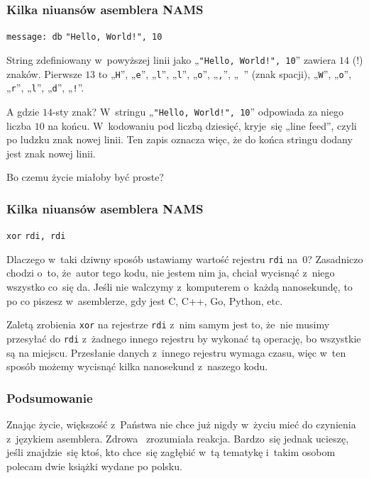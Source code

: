 \documentclass[10pt,t]{beamer}
\begin{document}
\begin{frame}
  \frametitle{Kilka niuansów asemblera NAMS}


  \texttt{message: db} \hphantom{aaaaa} \texttt{"Hello, World!", 10}

  String zdefiniowany w~powyższej linii jako „\texttt{"Hello, World!", 10}”
  zawiera $14$ (!) znaków. Pierwsze $13$ to „\texttt{H}”, „\texttt{e}”,
  „\texttt{l}”, „\texttt{l}”, „\texttt{o}”, „\texttt{,}”, „\texttt{ }”
  (znak spacji), „\texttt{W}”, „\texttt{o}”, „\texttt{r}”, „\texttt{l}”,
  „\texttt{d}”, „\texttt{!}”.

  A gdzie $14$-sty znak? W~stringu „\texttt{"Hello, World!", 10}”
  odpowiada za niego liczba $10$ na końcu. W~kodowaniu
   pod
  liczbą dziesięć, kryje~się „line feed”, czyli po ludzku znak nowej linii.
  Ten zapis oznacza więc, że do końca stringu dodany jest znak nowej linii.

  Bo czemu życie miałoby być proste?

\end{frame}





\begin{frame}
  \frametitle{Kilka niuansów asemblera NAMS}


  \hphantom{aaaaaaaaa} \texttt{xor} \hphantom{aaaaaa} \texttt{rdi, rdi}

  Dlaczego w~taki dziwny sposób ustawiamy wartość rejestru \texttt{rdi}
  na~$0$? Zasadniczo chodzi o~to, że~autor tego kodu, nie jestem nim ja,
  chciał wycisnąć z~niego wszystko co~się da. Jeśli nie walczymy
  z~komputerem o~każdą nanosekundę, to po co piszesz w~asemblerze, gdy jest
  C, C++, Go, Python, etc.

  Zaletą zrobienia \texttt{xor} na rejestrze \texttt{rdi} z~nim samym jest
  to, że~nie musimy przesyłać do \texttt{rdi} z~żadnego innego rejestru by
  wykonać tą operację, bo wszystkie są na miejscu. Przesłanie danych
  z~innego rejestru wymaga czasu, więc w~ten sposób możemy wycisnąć
  kilka nanosekund z~naszego kodu.

\end{frame}





\begin{frame}
  \frametitle{Podsumowanie}


  Znając życie, większość z~Państwa nie chce już nigdy w~życiu mieć
  do czynienia z~językiem asemblera. Zdrowa ~zrozumiała reakcja.
  Bardzo~się jednak ucieszę, jeśli znajdzie~się ktoś, kto chce~się
  zagłębić w~tą tematykę i~takim osobom polecam dwie książki wydane po
  polsku.

\end{frame}
\end{document}
